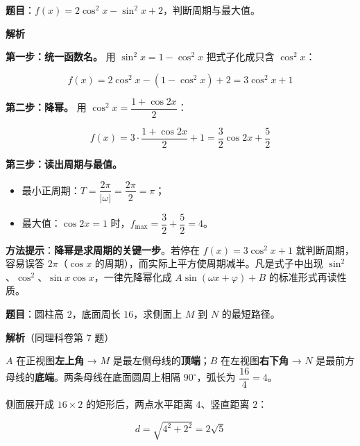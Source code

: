 \textbf{题目}：$f(x)=2\cos^{2}x-\sin^{2}x+2$，判断周期与最大值。

\textbf{解析}

\textbf{第一步：统一函数名。} 用 $\sin^{2}x=1-\cos^{2}x$ 把式子化成只含 $\cos^{2}x$：

\[f(x)=2\cos^{2}x-\left(1-\cos^{2}x\right)+2=3\cos^{2}x+1\]

\textbf{第二步：降幂。} 用 $\cos^{2}x=\dfrac{1+\cos2x}2$：

\[f(x)=3\cdot\frac{1+\cos2x}2+1=\frac32\cos2x+\frac52\]

\textbf{第三步：读出周期与最值。}

\begin{itemize}
\item 最小正周期：$T=\dfrac{2\pi}{|\omega|}=\dfrac{2\pi}2=\pi$；
\item 最大值：$\cos2x=1$ 时，$f_{\max}=\dfrac32+\dfrac52=4$。
\end{itemize}


\begin{gktip}
\textbf{方法提示}：\textbf{降幂是求周期的关键一步}。若停在 $f(x)=3\cos^{2}x+1$ 就判断周期，容易误答 $2\pi$（$\cos x$ 的周期），而实际上平方使周期减半。凡是式子中出现 $\sin^{2}$、$\cos^{2}$、$\sin x\cos x$，一律先降幂化成 $A\sin(\omega x+\varphi)+B$ 的标准形式再读性质。
\end{gktip}

\par\medskip


\textbf{题目}：圆柱高 $2$，底面周长 $16$，求侧面上 $M$ 到 $N$ 的最短路径。

\begin{center}\end{center}

\textbf{解析}（同理科卷第 7 题）

$A$ 在正视图\textbf{左上角} → $M$ 是最左侧母线的\textbf{顶端}；$B$ 在左视图\textbf{右下角} → $N$ 是最前方母线的\textbf{底端}。两条母线在底面圆周上相隔 $90^\circ$，弧长为 $\dfrac{16}4=4$。

侧面展开成 $16\times2$ 的矩形后，两点水平距离 $4$、竖直距离 $2$：

\[d=\sqrt{4^{2}+2^{2}}=2\sqrt5\]


\par\medskip

